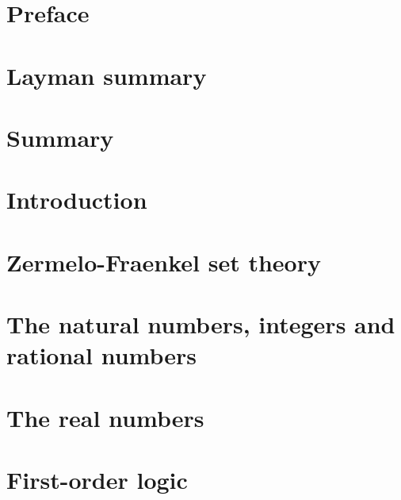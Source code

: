 \documentclass[10pt, a4paper]{report}
\theoremstyle{definition}
\begin{document}
\setcounter{page}{5}

\chapter*{Preface}\label{chap:preface}

\newpage

\chapter*{Layman summary}\label{chap:layman_summary}

\newpage

\chapter*{Summary}\label{chap:summary}

\newpage

\chapter*{Introduction}\label{chap:introduction}

\newpage

\tableofcontents
\newpage


\chapter{Zermelo-Fraenkel set theory}\label{chap:zermelo_fraenkel_set_theory}

\newpage

\chapter{The natural numbers, integers and rational numbers}\label{chap:the_natural_numbers_integers_and_rational_numbers}

\newpage

\chapter{The real numbers}\label{chap:the_real_numbers}

\newpage

\printbibliography[title={Bibliography}]

\appendix

\chapter{First-order logic}\label{app:first_order_logic}

\end{document}
